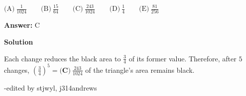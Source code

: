 \begin{enumerate}
$\text{(A)}\ \frac{1}{1024} \qquad \text{(B)}\ \frac{15}{64} \qquad \text{(C)}\ \frac{243}{1024} \qquad \text{(D)}\ \frac{1}{4} \qquad \text{(E)}\ \frac{81}{256}$

 \textbf{Answer: }C



\textbf{Solution}

Each change reduces the black area to $\frac{3}{4}$ of its former value.  Therefore, after  $5$ changes, $\left( \frac{3}{4} \right)^5= \boxed{\textbf{(C)}\ \frac{243}{1024}}$ of the triangle's area remains black.

 -edited by stjwyl, j314andrews

 


\end{enumerate}